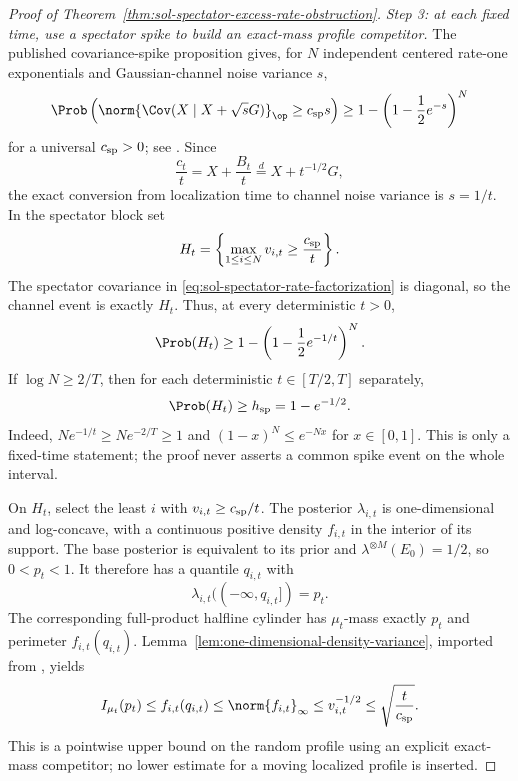 \documentclass[../main.tex]{subfiles}
\begin{document}
\begin{proof}[Proof of Theorem~\ref{thm:sol-spectator-excess-rate-obstruction}]
\emph{Step 3: at each fixed time, use a spectator spike to build an exact-mass profile
competitor.}
The published covariance-spike proposition gives, for $N$ independent centered rate-one
exponentials and Gaussian-channel noise variance $s$,
\begin{equation}
  \Prob\left(
    \norm{\Cov(X\mid X+\sqrt sG)}_\op\ge c_{\rm sp}s
  \right)
  \ge1-\left(1-\frac12e^{-s}\right)^N
  \label{eq:sol-spectator-rate-channel}
\end{equation}
for a universal $c_{\rm sp}>0$; see \cite[Prop.~65]{KLnotes}.  Since
\[
  \frac{c_t}{t}=X+\frac{B_t}{t}
  \stackrel{d}=X+t^{-1/2}G,
\]
the exact conversion from localization time to channel noise variance is $s=1/t$.  In the
spectator block set
\[
  H_t=\left\{\max_{1\le i\le N}v_{i,t}\ge\frac{c_{\rm sp}}t\right\}.
\]
The spectator covariance in \eqref{eq:sol-spectator-rate-factorization} is diagonal, so the
channel event is exactly $H_t$.  Thus, at every deterministic $t>0$,
\begin{equation}
  \Prob(H_t)\ge1-\left(1-\frac12e^{-1/t}\right)^N.
  \label{eq:sol-spectator-rate-fixed-time}
\end{equation}
If $\log N\ge2/T$, then for each deterministic $t\in[T/2,T]$ separately,
\begin{equation}
  \Prob(H_t)\ge h_{\rm sp}=1-e^{-1/2}.
  \label{eq:sol-spectator-rate-fixed-time-positive}
\end{equation}
Indeed, $Ne^{-1/t}\ge Ne^{-2/T}\ge1$ and
$(1-x)^N\le e^{-Nx}$ for $x\in[0,1]$.
This is only a fixed-time statement; the proof never asserts a common spike event on the whole
interval.

On $H_t$, select the least $i$ with $v_{i,t}\ge c_{\rm sp}/t$.  The posterior
$\lambda_{i,t}$ is one-dimensional and log-concave, with a continuous positive density
$f_{i,t}$ in the interior of its support.  The base posterior is equivalent to its prior and
$\lambda^{\otimes M}(E_0)=1/2$, so $0<p_t<1$.  It therefore has a quantile $q_{i,t}$ with
\[
  \lambda_{i,t}(( -\infty,q_{i,t}])=p_t.
\]
The corresponding full-product halfline cylinder has $\mu_t$-mass exactly $p_t$ and perimeter
$f_{i,t}(q_{i,t})$.  Lemma~\ref{lem:one-dimensional-density-variance}, imported from
\cite[Prop.~2.1]{BobkovChistyakov2015Concentration}, yields
\begin{equation}
  I_{\mu_t}(p_t)\le f_{i,t}(q_{i,t})
  \le\norm{f_{i,t}}_\infty
  \le v_{i,t}^{-1/2}
  \le\sqrt{\frac{t}{c_{\rm sp}}}.
  \label{eq:sol-spectator-rate-profile-competitor}
\end{equation}
This is a pointwise upper bound on the random profile using an explicit exact-mass competitor;
no lower estimate for a moving localized profile is inserted.


\end{proof}
\end{document}
